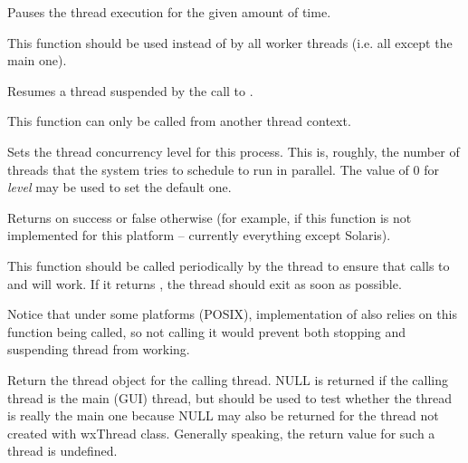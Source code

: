 \label{wxthreadsleep}


Pauses the thread execution for the given amount of time.

This function should be used instead of  by all worker
threads (i.e. all except the main one).


\label{wxthreadresume}


Resumes a thread suspended by the call to .

This function can only be called from another thread context.


\label{wxthreadsetconcurrency}


Sets the thread concurrency level for this process. This is, roughly, the
number of threads that the system tries to schedule to run in parallel.
The value of $0$ for {\it level} may be used to set the default one.

Returns \true on success or false otherwise (for example, if this function is
not implemented for this platform -- currently everything except Solaris).


\label{wxthreadtestdestroy}


This function should be called periodically by the thread to ensure that calls
to  and  will
work. If it returns \true, the thread should exit as soon as possible.

Notice that under some platforms (POSIX), implementation of 
 also relies on this function being called, so
not calling it would prevent both stopping and suspending thread from working.


\label{wxthreadthis}


Return the thread object for the calling thread. NULL is returned if the calling thread
is the main (GUI) thread, but  should be used to test
whether the thread is really the main one because NULL may also be returned for the thread
not created with wxThread class. Generally speaking, the return value for such a thread
is undefined.


